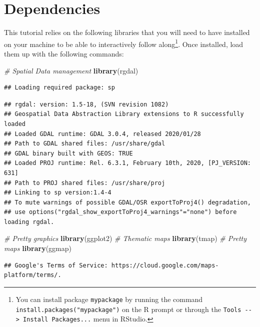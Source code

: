 \documentclass[
]{book}
\newenvironment{Shaded}{\begin{snugshade}}{\end{snugshade}}
\newcommand{\CommentTok}[1]{\textcolor[rgb]{0.56,0.35,0.01}{\textit{#1}}}
\newcommand{\KeywordTok}[1]{\textcolor[rgb]{0.13,0.29,0.53}{\textbf{#1}}}
\newcommand{\NormalTok}[1]{#1}
\begin{document}
\hypertarget{dependencies-2}{%
\section{Dependencies}\label{dependencies-2}}

This tutorial relies on the following libraries that you will need to have installed on your machine to be able to interactively follow along\footnote{You can install package \texttt{mypackage} by running the command \texttt{install.packages("mypackage")} on the R prompt or through the \texttt{Tools\ -\/-\textgreater{}\ Install\ Packages...} menu in RStudio.}. Once installed, load them up with the following commands:

\begin{Shaded}
\begin{Highlighting}[]
\CommentTok{# Spatial Data management}
\KeywordTok{library}\NormalTok{(rgdal)}
\end{Highlighting}
\end{Shaded}

\begin{verbatim}
## Loading required package: sp
\end{verbatim}

\begin{verbatim}
## rgdal: version: 1.5-18, (SVN revision 1082)
## Geospatial Data Abstraction Library extensions to R successfully loaded
## Loaded GDAL runtime: GDAL 3.0.4, released 2020/01/28
## Path to GDAL shared files: /usr/share/gdal
## GDAL binary built with GEOS: TRUE 
## Loaded PROJ runtime: Rel. 6.3.1, February 10th, 2020, [PJ_VERSION: 631]
## Path to PROJ shared files: /usr/share/proj
## Linking to sp version:1.4-4
## To mute warnings of possible GDAL/OSR exportToProj4() degradation,
## use options("rgdal_show_exportToProj4_warnings"="none") before loading rgdal.
\end{verbatim}

\begin{Shaded}
\begin{Highlighting}[]
\CommentTok{# Pretty graphics}
\KeywordTok{library}\NormalTok{(ggplot2)}
\CommentTok{# Thematic maps}
\KeywordTok{library}\NormalTok{(tmap)}
\CommentTok{# Pretty maps}
\KeywordTok{library}\NormalTok{(ggmap)}
\end{Highlighting}
\end{Shaded}

\begin{verbatim}
## Google's Terms of Service: https://cloud.google.com/maps-platform/terms/.
\end{verbatim}
\end{document}
